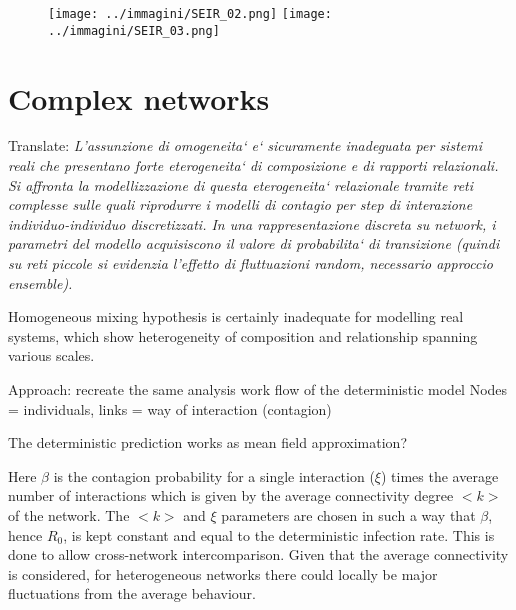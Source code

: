\documentclass[DIV=12, BCOR=0pt]{scrartcl}  %
\begin{document}
  \begin{figure}[h]
  	\centering
  	\texttt{[image: ../immagini/SEIR\_02.png]}
  	\texttt{[image: ../immagini/SEIR\_03.png]}
  	\caption{}
  	\label{}
  \end{figure}

  
  
  
  
  
  
  
  
  
  
  \section{Complex networks}
  Translate: \textit{L'assunzione di omogeneita` e` sicuramente inadeguata per sistemi reali che presentano forte eterogeneita` di composizione e di rapporti relazionali. Si affronta la modellizzazione di questa eterogeneita` relazionale tramite reti complesse sulle quali riprodurre i modelli di contagio per step di interazione individuo-individuo discretizzati. In una rappresentazione discreta su network, i parametri del modello acquisiscono il valore di probabilita` di transizione (quindi su reti piccole si evidenzia l'effetto di fluttuazioni random, necessario approccio ensemble).  }
  
  Homogeneous mixing hypothesis is certainly inadequate for modelling real systems, which show heterogeneity of composition and relationship spanning various scales. 
  
  
  
  
  Approach: recreate the same analysis work flow of the deterministic model
  Nodes = individuals, links = way of interaction (contagion)
  
  The deterministic prediction works as mean field approximation?
  
  Here $\beta$ is the contagion probability for a single interaction ($\xi$) times the average number of interactions which is given by the average connectivity degree $<k>$ of the network. The $<k>$ and $\xi$ parameters are chosen in such a way that $\beta$, hence $R_{0}$, is kept constant and equal to the deterministic infection rate. This is done to allow cross-network intercomparison. Given that the average connectivity is considered, for heterogeneous networks there could locally be major fluctuations from the average behaviour.
  
\end{document}
